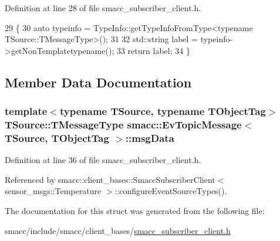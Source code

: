 Definition at line 28 of file smacc\+\_\+subscriber\+\_\+client.\+h.


\begin{DoxyCode}
29   \{
30     \textcolor{keyword}{auto} typeinfo = TypeInfo::getTypeInfoFromType<typename TSource::TMessageType>();
31 
32     std::string label = typeinfo->getNonTemplatetypename();
33     \textcolor{keywordflow}{return} label;
34   \}
\end{DoxyCode}


\subsection{Member Data Documentation}
\subsubsection[{\texorpdfstring{msg\+Data}{msgData}}]{\setlength{\rightskip}{0pt plus 5cm}template$<$typename T\+Source, typename T\+Object\+Tag$>$ T\+Source\+::\+T\+Message\+Type {\bf smacc\+::\+Ev\+Topic\+Message}$<$ T\+Source, T\+Object\+Tag $>$\+::msg\+Data}\hypertarget{structsmacc_1_1EvTopicMessage_adc167f5114cc3c4ff06ea9c810cc280f}{}\label{structsmacc_1_1EvTopicMessage_adc167f5114cc3c4ff06ea9c810cc280f}


Definition at line 36 of file smacc\+\_\+subscriber\+\_\+client.\+h.



Referenced by smacc\+::client\+\_\+bases\+::\+Smacc\+Subscriber\+Client$<$ sensor\+\_\+msgs\+::\+Temperature $>$\+::configure\+Event\+Source\+Types().



The documentation for this struct was generated from the following file\+:\begin{DoxyCompactItemize}
\item 
smacc/include/smacc/client\+\_\+bases/\hyperlink{smacc__subscriber__client_8h}{smacc\+\_\+subscriber\+\_\+client.\+h}\end{DoxyCompactItemize}
